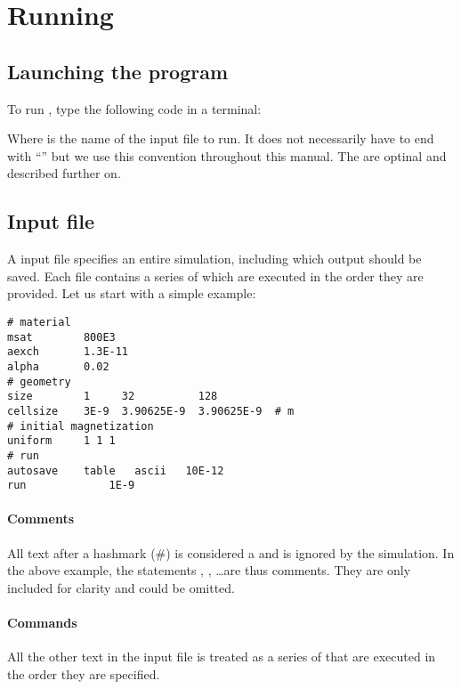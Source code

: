 \section{Running}

\subsection{Launching the program}

To run \prog, type the following code in a terminal:


Where \textit{} is the name of the input file to run. It does not necessarily have to end with ``'' but we use this convention throughout this manual. The \textit{} are optinal and described further on. 

\subsection{Input file}

A \prog input file specifies an entire simulation, including which output should be saved. Each file contains a series of  which are executed in the order they are provided. Let us start with a simple example:


\begin{verbatim}
# material
msat       	800E3 
aexch      	1.3E-11
alpha      	0.02
# geometry 
size       	1     32          128    
cellsize   	3E-9  3.90625E-9  3.90625E-9  # m
# initial magnetization
uniform		1 1 1
# run
autosave	table	ascii	10E-12
run          	1E-9
\end{verbatim}

\paragraph{Comments} All text after a hashmark (\#) is considered a  and is ignored by the simulation. In the above example, the statements , , \ldots are thus comments. They are only included for clarity and could be omitted.

\paragraph{Commands} All the other text in the input file is treated as a series of  that are executed in the order they are specified.


